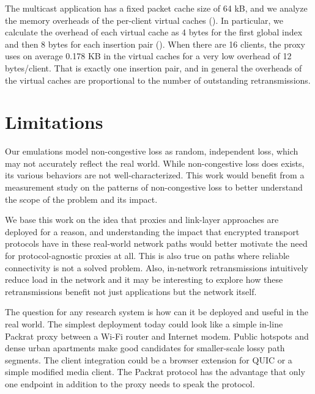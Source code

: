 The multicast application has a fixed packet cache size of 64 kB, and we analyze
the memory overheads of the per-client virtual caches ().
In particular, we calculate the overhead of each virtual cache as 4 bytes for
the first global index and then 8 bytes for each insertion pair
(). When there are 16 clients, the proxy
uses on average 0.178 KB in the virtual caches for a very low overhead of 12
bytes/client. That is exactly one insertion pair, and in general the overheads
of the virtual caches are proportional to the number of outstanding
retransmissions.

\section{Limitations}
\label{sec:packrat:limitations}

Our emulations model non-congestive loss as random, independent loss,
which may not accurately reflect the real world. While non-congestive loss
does exists, its various behaviors are not well-characterized. This work
would benefit from a measurement study on the patterns of non-congestive loss
to better understand the scope of the problem and its impact.

We base this work on the idea that proxies and link-layer approaches are
deployed for a reason, and understanding the impact that encrypted transport
protocols have in these real-world network paths would better motivate the need
for protocol-agnostic proxies at all. This is also true on paths where
reliable connectivity is not a solved problem. Also,
in-network retransmissions intuitively reduce load in the network and it may be
interesting to explore how these retransmissions benefit not just
applications but the network itself.

The question for any research system is how can it be deployed and useful in
the real world. The simplest deployment today could look like a simple in-line
Packrat proxy between a Wi-Fi router and Internet modem. Public hotspots and
dense urban apartments make good candidates for smaller-scale lossy path
segments.
The client integration could be a browser extension for QUIC or a simple
modified media client.
The Packrat protocol has the advantage that only one endpoint in addition to the
proxy needs to speak the protocol.

